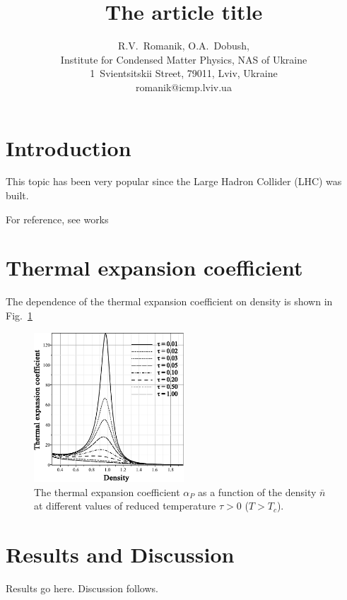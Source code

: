\documentclass[12pt]{article}
\title{The article title}
\author{R.V.~Romanik, O.A.~Dobush,
	\\ \small Institute for Condensed Matter Physics, NAS of Ukraine 
	\\ \small 1~Svientsitskii Street, 79011, Lviv, Ukraine 
	\\ \small romanik@icmp.lviv.ua}
\begin{document}
	
	\maketitle
	
	
	\section{Introduction}
	This topic has been very popular since the Large Hadron Collider (LHC) was built.
	
	For reference, see works~\cite{Cooper}
	
	\section{Thermal expansion coefficient}
	The dependence of the thermal expansion coefficient on density is shown in Fig.~\ref{fig4}
	
	\begin{figure}[h!]
		\centering \includegraphics[width=0.5\textwidth]{f4.pdf}
		\vskip-3mm\caption{The thermal expansion coefficient $\alpha_P$ as a function of the density $\bar n$ at different values of reduced temperature $\tau > 0$ ($T > T_c$). 
		}\label{fig4}
	\end{figure}
	
	\section{Results and Discussion}
	Results go here. Discussion follows.
	
	
	
\end{document}
